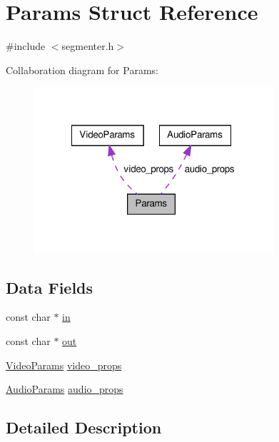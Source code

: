 \hypertarget{struct_params}{\section{\-Params \-Struct \-Reference}
\label{struct_params}
}


{\ttfamily \#include $<$segmenter.\-h$>$}



\-Collaboration diagram for \-Params\-:\nopagebreak
\begin{figure}[H]
\begin{center}
\leavevmode
\includegraphics[width=251pt]{struct_params__coll__graph}
\end{center}
\end{figure}
\subsection*{\-Data \-Fields}
\begin{DoxyCompactItemize}
\item 
const char $\ast$ \hyperlink{struct_params_a52bb50fce643c4899922808db7d60d42}{in}
\item 
const char $\ast$ \hyperlink{struct_params_a8905de849f303a8598c0f7c3d37d46ed}{out}
\item 
\hyperlink{struct_video_params}{\-Video\-Params} \hyperlink{struct_params_ae8e5c5323efdf97ec1e66866b906f813}{video\-\_\-props}
\item 
\hyperlink{struct_audio_params}{\-Audio\-Params} \hyperlink{struct_params_a219b79cb42ef34f697906a8d8366c947}{audio\-\_\-props}
\end{DoxyCompactItemize}


\subsection{\-Detailed \-Description}


